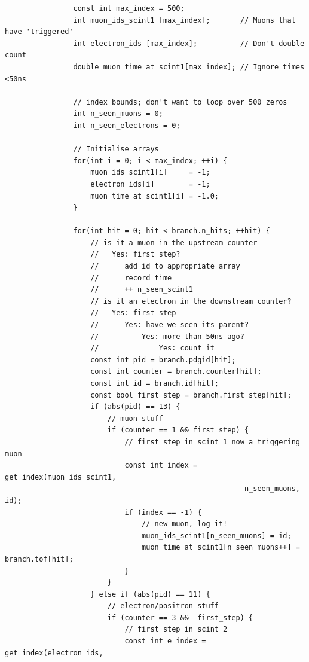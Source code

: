 \documentclass[]{article}
\begin{document}
\begin{verbatim}
                const int max_index = 500;
                int muon_ids_scint1 [max_index];       // Muons that have 'triggered'
                int electron_ids [max_index];          // Don't double count
                double muon_time_at_scint1[max_index]; // Ignore times <50ns
                
                // index bounds; don't want to loop over 500 zeros
                int n_seen_muons = 0;  
                int n_seen_electrons = 0;

                // Initialise arrays
                for(int i = 0; i < max_index; ++i) {
                    muon_ids_scint1[i]     = -1;
                    electron_ids[i]        = -1;
                    muon_time_at_scint1[i] = -1.0;
                }

                for(int hit = 0; hit < branch.n_hits; ++hit) {
                    // is it a muon in the upstream counter
                    //   Yes: first step?
                    //      add id to appropriate array
                    //      record time
                    //      ++ n_seen_scint1
                    // is it an electron in the downstream counter?
                    //   Yes: first step
                    //      Yes: have we seen its parent?
                    //          Yes: more than 50ns ago?
                    //              Yes: count it
                    const int pid = branch.pdgid[hit];
                    const int counter = branch.counter[hit];
                    const int id = branch.id[hit];
                    const bool first_step = branch.first_step[hit];
                    if (abs(pid) == 13) {
                        // muon stuff
                        if (counter == 1 && first_step) {
                            // first step in scint 1 now a triggering muon
                            const int index = get_index(muon_ids_scint1,
                                                        n_seen_muons, id);
                            if (index == -1) {
                                // new muon, log it!
                                muon_ids_scint1[n_seen_muons] = id;
                                muon_time_at_scint1[n_seen_muons++] = branch.tof[hit];
                            } 
                        }
                    } else if (abs(pid) == 11) {
                        // electron/positron stuff
                        if (counter == 3 &&  first_step) {
                            // first step in scint 2    
                            const int e_index = get_index(electron_ids,

\end{verbatim}
\end{document}
